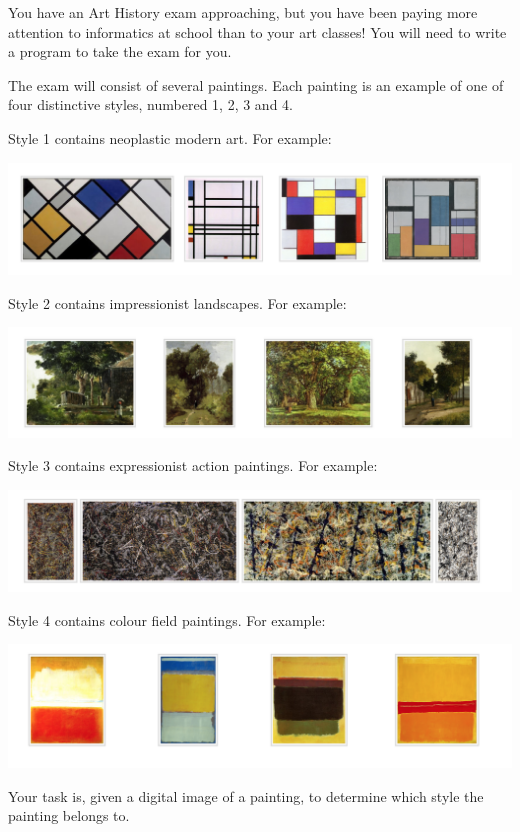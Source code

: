 You have an Art History exam approaching, but you have been paying more attention to
informatics at school than to your art classes! You will need to write a program to take the
exam for you.

The exam will consist of several paintings. Each painting is an example of one of four
distinctive styles, numbered 1, 2, 3 and 4.

Style 1 contains neoplastic modern art. For example:

\includegraphics[scale=0.8]{artclass1.png}

Style 2 contains impressionist landscapes. For example:

\includegraphics[scale=0.8]{artclass2.png}

Style 3 contains expressionist action paintings. For example:

\includegraphics[scale=0.8]{artclass3.png}

Style 4 contains colour field paintings. For example:

\includegraphics[scale=0.8]{artclass4.png}

Your task is, given a digital image of a painting, to determine which style the painting
belongs to.

